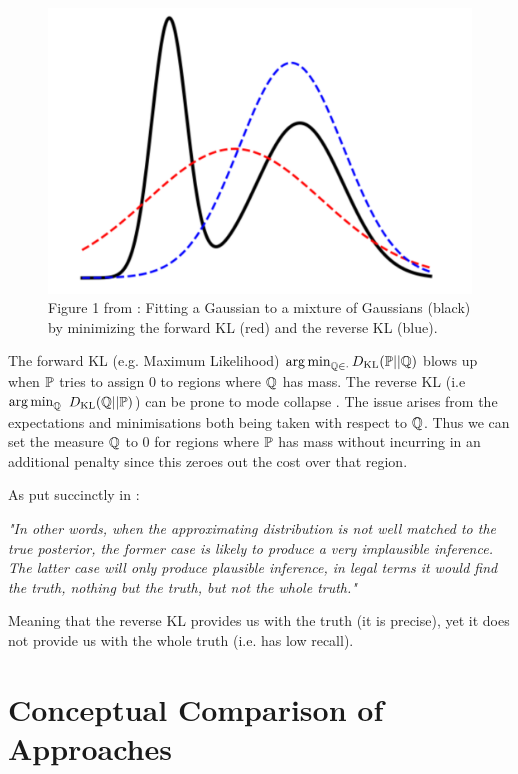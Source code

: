 \documentclass[a4paper,12pt,twoside,openright]{report}
\theoremstyle{definition}
\begin{document}
\begin{figure}
    \centering
    \includegraphics[scale=0.5]{images/zhang_et_al.PNG}
    \caption{Figure 1 from \cite{zhang2019variational}:  Fitting a Gaussian to a mixture of Gaussians (black) by
minimizing the forward KL (red) and the reverse KL (blue).}
    \label{fig:babrber_kl}
\end{figure}

The forward KL (e.g. Maximum Likelihood)  $\argmin_{\Q \in \cdot }\KL(\P ||\Q)$  blows up  when $\P$ tries to assign $0$ to regions where $\Q$ has mass. The reverse KL (i.e $\argmin_{\Q }$ $\KL(\Q ||\P)$) can be prone to mode collapse \citep{zhang2019variational}. The issue arises from the expectations and minimisations both being taken with respect to $\Q$. Thus we can set the measure $\Q$ to 0 for regions where $\P$ has mass without incurring in an additional penalty since this zeroes out the cost over that region.

As put succinctly in \cite{lawrence2001variational}:

\textit{"In other words, when the approximating distribution is not
well matched to the true posterior, the former case is likely to produce a very implausible inference.
The latter case will only produce plausible inference, in legal terms it would find the truth, nothing
but the truth, but not the whole truth."}

Meaning that the reverse KL provides us with the truth (it is precise), yet  it does not provide us with the whole truth (i.e. has low recall).

\section{Conceptual Comparison of Approaches}
\end{document}
